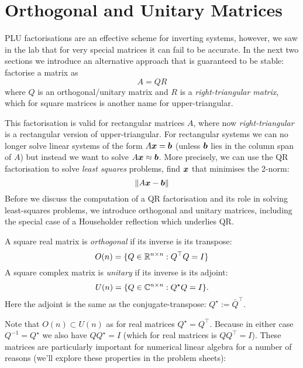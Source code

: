 
\section{Orthogonal and Unitary Matrices}
PLU factorisations are an effective scheme for inverting systems, however, we saw in the lab that for very special matrices it can fail to be accurate. In the next two sections we introduce an alternative approach that is guaranteed to be stable: factorise a matrix as
\[
A = QR
\]
where $Q$ is an orthogonal/unitary matrix and $R$ is a \emph{right-triangular matrix}, which for square matrices is another name for upper-triangular.

This factorisation is valid for rectangular matrices $A$, where now \emph{right-triangular} is a rectangular version of upper-triangular. For rectangular systems we can no longer solve linear systems of the form $A\bm{{\mbox{\boldmath$x$\unboldmath}}} = \bm{{\mbox{\boldmath$b$\unboldmath}}}$ (unless $\bm{{\mbox{\boldmath$b$\unboldmath}}}$ lies in the column span of $A$) but instead we want to solve $A\bm{{\mbox{\boldmath$x$\unboldmath}}} \approx \bm{{\mbox{\boldmath$b$\unboldmath}}}$. More precisely, we can use the QR factorisation to solve \emph{least squares} problems, find $\bm{{\mbox{\boldmath$x$\unboldmath}}}$ that minimises the 2-norm:
\[
\|A \bm{{\mbox{\boldmath$x$\unboldmath}}} - \bm{{\mbox{\boldmath$b$\unboldmath}}} \|
\]
Before we discuss the computation of a QR factorisation and its role in solving least-squares problems, we introduce orthogonal and unitary matrices, including the special case of a Householder reflection which underlies QR.

\begin{definition} A square real matrix is \emph{orthogonal} if its inverse is its transpose:
\[
O(n) = \{Q \in {\mathbb R}^{n \times n} : Q^\top Q = I \}
\]
A square complex matrix is \emph{unitary} if its inverse is its adjoint:
\[
U(n) = \{Q \in {\mathbb C}^{n \times n} : Q^\star Q = I \}.
\]
Here the adjoint is the same as the conjugate-transpose: $Q^\ensuremath{\star} := \bar Q^\ensuremath{\top}$.  \end{definition}

Note that $O(n) \ensuremath{\subset} U(n)$ as for real matrices $Q^\ensuremath{\star} = Q^\ensuremath{\top}$. Because in either case $Q^{-1} = Q^\ensuremath{\star}$ we also have $Q Q^\ensuremath{\star} = I$ (which for real matrices is $Q Q^\ensuremath{\top} = I$). These matrices are particularly important for numerical linear algebra for a number of reasons (we'll explore these properties in the problem sheets):

